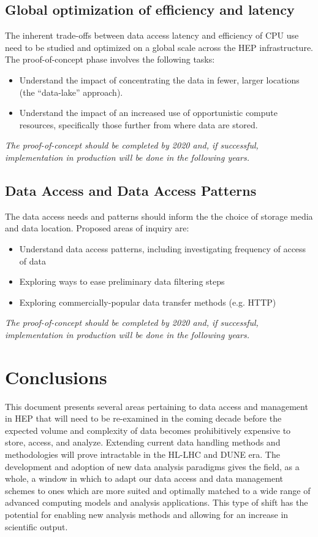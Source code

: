 \documentclass[12pt,a4paper]{article}
\begin{document}
\subsection{Global optimization of efficiency and latency}\label{efficiency-latency}
The inherent trade-offs between data access latency and efficiency of CPU use need to be studied and optimized
on a global scale across the HEP infrastructure. The proof-of-concept phase involves the following tasks:

\begin{itemize}
\item Understand the impact of concentrating the
  data in fewer, larger locations (the ``data-lake'' approach).
\item Understand the impact of an increased use of
  opportunistic compute resources, specifically those further from where data are stored.
\end{itemize}

\emph{The  proof-of-concept should be completed by 2020 and, if successful, implementation in
production will be done in the following years.}

\subsection{Data Access and Data Access Patterns}\label{access-patterns}
The data access needs and patterns should inform the the choice of storage media and data location. Proposed areas of inquiry are:

\begin{itemize}
\item Understand data access patterns, including investigating frequency of access of data
\item Exploring ways to ease preliminary data filtering steps
\item Exploring commercially-popular data transfer methods (e.g. HTTP)
\end{itemize}
\emph{The  proof-of-concept should be completed by 2020 and, if successful, implementation in
production will be done in the following years.}

\section{Conclusions}\label{conclusions}

This document presents several
areas pertaining to data access and management in HEP that will need to
be re-examined in the coming decade before the expected volume and
complexity of data becomes prohibitively expensive to store, access, and
analyze. Extending current data handling methods and methodologies will
prove intractable in the HL-LHC and DUNE era. The development and
adoption of new data analysis paradigms gives the field, as a whole, a
window in which to adapt our data access and data management schemes to
ones which are more suited and optimally matched to a wide range of
advanced computing models and analysis applications. This type of shift
has the potential for enabling new analysis methods and allowing for an
increase in scientific output.


\sloppy
\raggedright
\clearpage
\printbibliography[title={References},heading=bibintoc]
\end{document}
